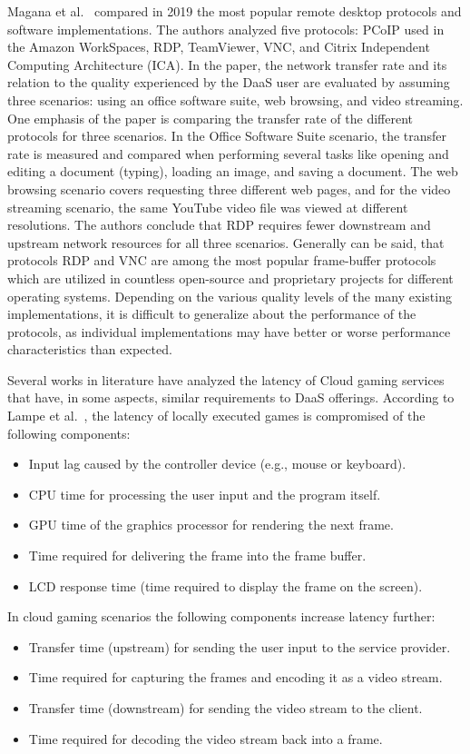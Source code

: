 \documentclass[runningheads]{llncs}
\begin{document}
Magana et al.~\cite{magana2019remote} compared in 2019
the most popular remote desktop protocols and software implementations.
The authors analyzed five protocols:
PCoIP used in the Amazon WorkSpaces, RDP, TeamViewer, VNC,
and Citrix Independent Computing Architecture (ICA).
In the paper, the network transfer rate and its relation to the quality
experienced by the DaaS user are evaluated
by assuming three scenarios:
using an office software suite, web browsing, and video streaming.
One emphasis of the paper is comparing the transfer rate
of the different protocols for three scenarios.
In the Office Software Suite scenario,
the transfer rate is measured and compared
when performing several tasks like opening
and editing a document (typing), loading an image, and saving a document.
The web browsing scenario covers requesting three different web pages,
and for the video streaming scenario,
the same YouTube video file was viewed at different resolutions.
The authors conclude that RDP requires fewer downstream
and upstream network resources for all three scenarios.
Generally can be said, that protocols RDP and VNC
are among the most popular frame-buffer protocols
which are utilized in countless open-source and proprietary projects
for different operating systems.
Depending on the various quality levels of the many existing implementations,
it is difficult to generalize about the performance of the protocols,
as individual implementations may have better
or worse performance characteristics than expected.

Several works in literature have analyzed
the latency of Cloud gaming services that have, in some aspects,
similar requirements to DaaS offerings.
According to Lampe et al.~\cite{lampe2014assessing},
the latency of locally executed games is compromised of the following components:
\begin{itemize}
	\item Input lag caused by the controller device (e.g., mouse or keyboard).
	\item CPU time for processing the user input and the program itself.
	\item GPU time of the graphics processor for rendering the next frame.
	\item Time required for delivering the frame into the frame buffer.
	\item LCD response time (time required to display the frame on the screen).
\end{itemize}


In cloud gaming scenarios the following components increase latency further:
\begin{itemize}
	\item Transfer time (upstream) for sending the user input to the service provider.
	\item Time required for capturing the frames and encoding it as a video stream.
	\item Transfer time (downstream) for sending the video stream to the client.
	\item Time required for decoding the video stream back into a frame.
\end{itemize}
\end{document}

